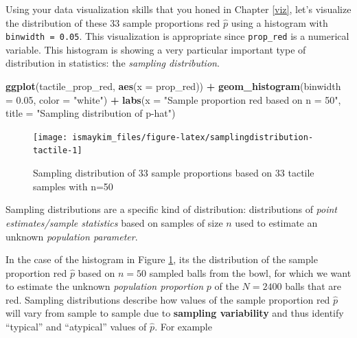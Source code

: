 \documentclass[12pt,]{krantz}
\makeatletter
\newenvironment{Shaded}{\begin{snugshade}}{\end{snugshade}}
\newcommand{\KeywordTok}[1]{\textcolor[rgb]{0.27,0.27,0.27}{\textbf{#1}}}
\newcommand{\DataTypeTok}[1]{\textcolor[rgb]{0.27,0.27,0.27}{#1}}
\newcommand{\FloatTok}[1]{\textcolor[rgb]{0.06,0.06,0.06}{#1}}
\newcommand{\StringTok}[1]{\textcolor[rgb]{0.5,0.5,0.5}{#1}}
\newcommand{\OperatorTok}[1]{\textcolor[rgb]{0.43,0.43,0.43}{\textbf{#1}}}
\newcommand{\NormalTok}[1]{#1}
\newenvironment{kframe}{%
\medskip{}
\setlength{\fboxsep}{.8em}
 \def\at@end@of@kframe{}%
 \ifinner\ifhmode%
  \def\at@end@of@kframe{\end{minipage}}%
  \begin{minipage}{\columnwidth}%
 \fi\fi%
 \def\FrameCommand##1{\hskip\@totalleftmargin \hskip-\fboxsep
 \colorbox{shadecolor}{##1}\hskip-\fboxsep
     \hskip-\linewidth \hskip-\@totalleftmargin \hskip\columnwidth}%
 \MakeFramed {\advance\hsize-\width
   \@totalleftmargin\z@ \linewidth\hsize
   \@setminipage}}%
 {\par\unskip\endMakeFramed%
 \at@end@of@kframe}
\renewenvironment{Shaded}{\begin{kframe}}{\end{kframe}}
\theoremstyle{definition}
\theoremstyle{definition}
\theoremstyle{definition}
\theoremstyle{remark}
\makeatother
\begin{document}
\endgroup{}

Using your data visualization skills that you honed in Chapter
\ref{viz}, let's visualize the distribution of these 33 sample
proportions red \(\widehat{p}\) using a histogram with
\texttt{binwidth\ =\ 0.05}. This visualization is appropriate since
\texttt{prop\_red} is a numerical variable. This histogram is showing a
very particular important type of distribution in statistics: the
\emph{sampling distribution}.

\begin{Shaded}
\begin{Highlighting}[]
\KeywordTok{ggplot}\NormalTok{(tactile_prop_red, }\KeywordTok{aes}\NormalTok{(}\DataTypeTok{x =}\NormalTok{ prop_red)) }\OperatorTok{+}
\StringTok{  }\KeywordTok{geom_histogram}\NormalTok{(}\DataTypeTok{binwidth =} \FloatTok{0.05}\NormalTok{, }\DataTypeTok{color =} \StringTok{"white"}\NormalTok{) }\OperatorTok{+}
\StringTok{  }\KeywordTok{labs}\NormalTok{(}\DataTypeTok{x =} \StringTok{"Sample proportion red based on n = 50"}\NormalTok{, }
       \DataTypeTok{title =} \StringTok{"Sampling distribution of p-hat"}\NormalTok{) }
\end{Highlighting}
\end{Shaded}

\begin{figure}

{\centering \texttt{[image: ismaykim\_files/figure-latex/samplingdistribution-tactile-1]} 

}

\caption{Sampling distribution of 33 sample proportions based on 33 tactile samples with n=50}\label{fig:samplingdistribution-tactile}
\end{figure}

Sampling distributions are a specific kind of distribution:
distributions of \emph{point estimates/sample statistics} based on
samples of size \(n\) used to estimate an unknown \emph{population
parameter}.

In the case of the histogram in Figure
\ref{fig:samplingdistribution-tactile}, its the distribution of the
sample proportion red \(\widehat{p}\) based on \(n=50\) sampled balls
from the bowl, for which we want to estimate the unknown
\emph{population proportion} \(p\) of the \(N=2400\) balls that are red.
Sampling distributions describe how values of the sample proportion red
\(\widehat{p}\) will vary from sample to sample due to \textbf{sampling
variability} and thus identify ``typical'' and ``atypical'' values of
\(\widehat{p}\). For example
\end{document}
